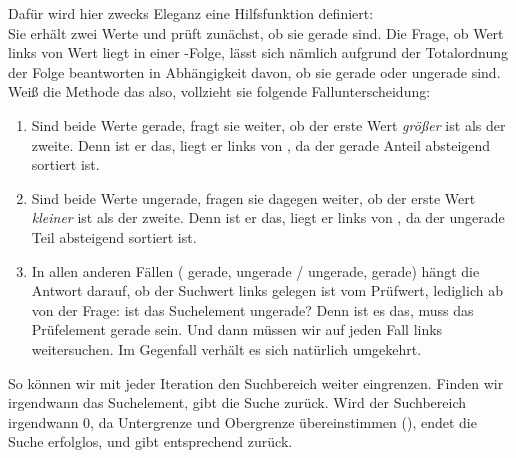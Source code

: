 \begin{aufgabe}
\begin{teile}
	Dafür wird hier zwecks Eleganz eine Hilfsfunktion  definiert: \\
    Sie erhält zwei Werte und prüft zunächst, ob sie gerade sind. Die Frage, ob Wert  links von Wert  liegt in einer -Folge, lässt sich nämlich aufgrund der Totalordnung der Folge beantworten in Abhängigkeit davon, ob sie gerade oder ungerade sind. Weiß die Methode das also, vollzieht sie folgende Fallunterscheidung: 
	\begin{enumerate}
	\item Sind beide Werte gerade, fragt sie weiter, ob der erste Wert \textit{größer} ist als der zweite. Denn ist er das, liegt er links von , da der gerade Anteil absteigend sortiert ist.
	\item Sind beide Werte ungerade, fragen sie dagegen weiter, ob der erste Wert \textit{kleiner} ist als der zweite. Denn ist er das, liegt er links von , da der ungerade Teil absteigend sortiert ist.
	\item In allen anderen Fällen ( gerade,  ungerade /  ungerade,  gerade) hängt die Antwort darauf, ob der Suchwert links gelegen ist vom Prüfwert, lediglich ab von der Frage: ist das Suchelement ungerade? Denn ist es das, muss das Prüfelement gerade sein. Und dann müssen wir auf jeden Fall links weitersuchen. Im Gegenfall verhält es sich natürlich umgekehrt.
	\end{enumerate}
	So können wir mit jeder Iteration den Suchbereich weiter eingrenzen. Finden wir irgendwann das Suchelement, gibt die Suche  zurück. Wird der Suchbereich irgendwann 0, da Untergrenze und Obergrenze übereinstimmen (), endet die Suche erfolglos, und gibt entsprechend  zurück. \\
		

\end{teile}
\end{aufgabe}
